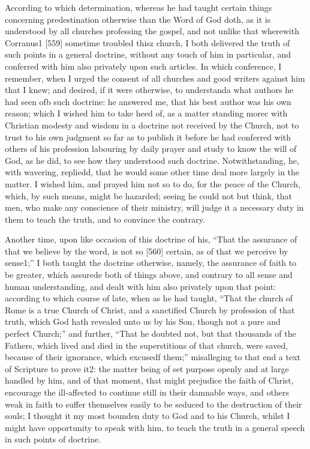 According to which determination, whereas he had taught certain things concerning predestination otherwise than the Word of God doth, as it is understood by all churches professing the gospel, and not unlike that wherewith Corranus1 [559] sometime troubled thisz church, I both delivered the truth of such points in a general doctrine, without any touch of him in particular, and conferred with him also privately upon such articles. In which conference, I remember, when I urged the consent of all churches and good writers against him that I knew; and desired, if it were otherwise, to understanda what authors he had seen ofb such doctrine: he answered me, that his best author was his own reason; which I wished him to take heed of, as a matter standing morec with Christian modesty and wisdom in a doctrine not received by the Church, not to trust to his own judgment so far as to publish it before he had conferred with others of his profession labouring by daily prayer and study to know the will of God, as he did, to see how they understood such doctrine. Notwithstanding, he, with wavering, repliedd, that he would some other time deal more largely in the matter. I wished him, and prayed him not so to do, for the peace of the Church, which, by such means, might be hazarded; seeing he could not but think, that men, who make any conscience of their ministry, will judge it a necessary duty in them to teach the truth, and to convince the contrary.

Another time, upon like occasion of this doctrine of his, “That the assurance of that we believe by the word, is not so [560] certain, as of that we perceive by sense1;” I both taught the doctrine otherwise, namely, the assurance of faith to be greater, which assurede both of things above, and contrary to all sense and human understanding, and dealt with him also privately upon that point: according to which course of late, when as he had taught, “That the church of Rome is a true Church of Christ, and a sanctified Church by profession of that truth, which God hath revealed unto us by his Son, though not a pure and perfect Church;” and further, “That he doubted not, but that thousands of the Fathers, which lived and died in the superstitions of that church, were saved, because of their ignorance, which excusedf them;” misalleging to that end a text of Scripture to prove it2: the matter being of set purpose openly and at large handled by him, and of that moment, that might prejudice the faith of Christ, encourage the ill-affected to continue still in their damnable ways, and others weak in faith to suffer themselves easily to be seduced to the destruction of their souls; I thought it my most bounden duty to God and to his Church, whilst I might have opportunity to speak with him, to teach the truth in a general speech in such points of doctrine.

